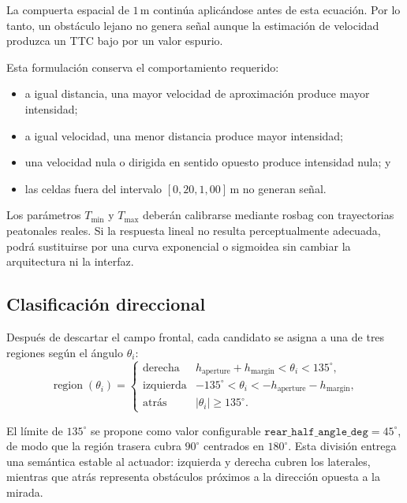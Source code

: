 La compuerta espacial de $1\,\text{m}$ continúa aplicándose antes de esta
ecuación. Por lo tanto, un obstáculo lejano no genera señal aunque la
estimación de velocidad produzca un TTC bajo por un valor espurio.

Esta formulación conserva el comportamiento requerido:
%
\begin{itemize}
  \item a igual distancia, una mayor velocidad de aproximación produce mayor
    intensidad;
  \item a igual velocidad, una menor distancia produce mayor intensidad;
  \item una velocidad nula o dirigida en sentido opuesto produce intensidad
    nula; y
  \item las celdas fuera del intervalo $[0{,}20,1{,}00]\,\text{m}$ no generan
    señal.
\end{itemize}

Los parámetros $T_{\min}$ y $T_{\max}$ deberán calibrarse mediante rosbag con
trayectorias peatonales reales. Si la respuesta lineal no resulta perceptualmente
adecuada, podrá sustituirse por una curva exponencial o sigmoidea sin cambiar
la arquitectura ni la interfaz.

\subsection{Clasificación direccional}
\label{subsec:sa-directions}

Después de descartar el campo frontal, cada candidato se asigna a una de tres
regiones según el ángulo $\theta_i$:
%
\begin{equation}
  \label{eq:sa-direction-classes}
  \operatorname{region}(\theta_i)=
  \begin{cases}
    \text{derecha} &
      h_{\text{aperture}}+h_{\text{margin}} < \theta_i < 135^\circ,\\
    \text{izquierda} &
      -135^\circ < \theta_i <
      -h_{\text{aperture}}-h_{\text{margin}},\\
    \text{atrás} &
      |\theta_i| \geq 135^\circ.
  \end{cases}
\end{equation}

El límite de $135^\circ$ se propone como valor configurable
$\texttt{rear\_half\_angle\_deg}=45^\circ$, de modo que la región trasera cubra
$90^{\circ}$ centrados en $180^{\circ}$. Esta división entrega una semántica
estable al actuador: izquierda y derecha cubren los laterales, mientras que
atrás representa obstáculos próximos a la dirección opuesta a la mirada.

